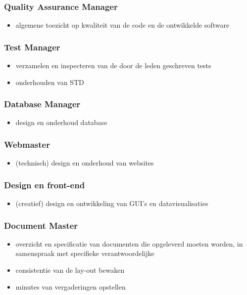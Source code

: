 \documentclass{article}
\begin{document}
\subsubsection*{Quality Assurance Manager}
\begin{itemize}
\item algemene toezicht op kwaliteit van de code en de ontwikkelde software
\end{itemize}

\subsubsection*{Test Manager}
\begin{itemize}
\item verzamelen en inspecteren van de door de leden geschreven tests
\item onderhouden van STD
\end{itemize}

\subsubsection*{Database Manager}
\begin{itemize}
\item design en onderhoud database
\end{itemize}

\subsubsection*{Webmaster}
\begin{itemize}
\item (technisch) design en onderhoud van websites
\end{itemize}

\subsubsection*{Design en front-end}
\begin{itemize}
\item (creatief) design en ontwikkeling van GUI's en datavisualisaties
\end{itemize}

\subsubsection*{Document Master}
\begin{itemize}
\item overzicht en specificatie van documenten die opgeleverd moeten worden, in samenspraak met specifieke verantwoordelijke 
\item consistentie van de lay-out bewaken
\item minutes van vergaderingen opstellen 
\end{itemize}
\end{document}
